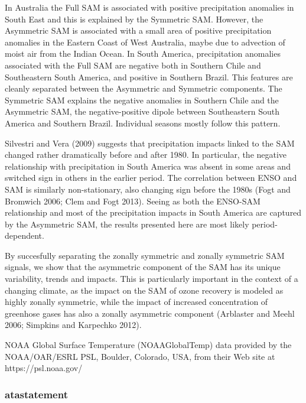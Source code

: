 \documentclass[smallextended]{svjour3}       %
\begin{document}
In Australia the Full SAM is associated with positive precipitation anomalies in South East and this is explained by the Symmetric SAM. However, the Asymmetric SAM is associated with a small area of positive precipitation anomalies in the Eastern Coast of West Australia, maybe due to advection of moist air from the Indian Ocean. In South America, precipitation anomalies associated with the Full SAM are negative both in Southern Chile and Southeastern South America, and positive in Southern Brazil. This features are cleanly separated between the Asymmetric and Symmetric components. The Symmetric SAM explains the negative anomalies in Southern Chile and the Asymmetric SAM, the negative-positive dipole between Southeastern South America and Southern Brazil. Individual seasons mostly follow this pattern.

Silvestri and Vera (2009) suggests that precipitation impacts linked to the SAM changed rather dramatically before and after 1980. In particular, the negative relationship with precipitation in South America was absent in some areas and switched sign in others in the earlier period. The correlation between ENSO and SAM is similarly non-stationary, also changing sign before the 1980s (Fogt and Bromwich 2006; Clem and Fogt 2013). Seeing as both the ENSO-SAM relationship and most of the precipitation impacts in South America are captured by the Asymmetric SAM, the results presented here are most likely period-dependent.

By succesfully separating the zonally symmetric and zonally symmetric SAM signals, we show that the asymmetric component of the SAM has its unique variability, trends and impacts. This is particularly important in the context of a changing climate, as the impact on the SAM of ozone recovery is modeled as highly zonally symmetric, while the impact of increased concentration of greenhose gases has also a zonally asymmetric component (Arblaster and Meehl 2006; Simpkins and Karpechko 2012).

\begin{acknowledgements}
NOAA Global Surface Temperature (NOAAGlobalTemp) data provided by the NOAA/OAR/ESRL PSL, Boulder, Colorado, USA, from their Web site at https://psl.noaa.gov/ 
\end{acknowledgements}

\hypertarget{atastatement}{%
\subsubsection{atastatement}\label{atastatement}}
\end{document}
